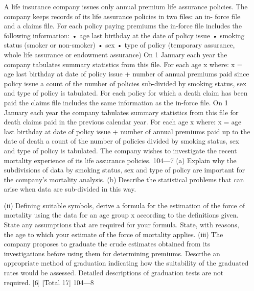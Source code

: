 A life insurance company issues only annual premium life assurance policies.
The company keeps records of its life assurance policies in two files: an in-
force file and a claims file.
For each policy paying premiums the in-force file includes the following
information:
• age last birthday at the date of policy issue
• smoking status (smoker or non-smoker)
• sex
• type of policy (temporary assurance, whole life assurance or endowment
assurance)
On 1 January each year the company tabulates summary statistics from this
file. For each age x where:
x = age last birthday at date of policy issue
+ number of annual premiums paid since policy issue
a count of the number of policies sub-divided by smoking status, sex and type
of policy is tabulated.
For each policy for which a death claim has been paid the claims file includes
the same information as the in-force file.
On 1 January each year the company tabulates summary statistics from this
file for death claims paid in the previous calendar year. For each age x where:
x = age last birthday at date of policy issue
+ number of annual premiums paid up to the date of death
a count of the number of policies divided by smoking status, sex and type of
policy is tabulated.
The company wishes to investigate the recent mortality experience of its life
assurance policies.
104—7
(a) Explain why the subdivisions of data by smoking status, sex and
type of policy are important for the company’s mortality analysis.
(b) Describe the statistical problems that can arise when data are
sub-divided in this way.

(ii) Defining suitable symbols, derive a formula for the estimation of the
force of mortality using the data for an age group x according to the
definitions given. State any assumptions that are required for your
formula. State, with reasons, the age to which your estimate of the
force of mortality applies.
(iii) The company proposes to graduate the crude estimates obtained from
its investigations before using them for determining premiums.
Describe an appropriate method of graduation indicating how the
suitability of the graduated rates would be assessed. Detailed
descriptions of graduation tests are not required.
[6]
[Total 17]
104—8





